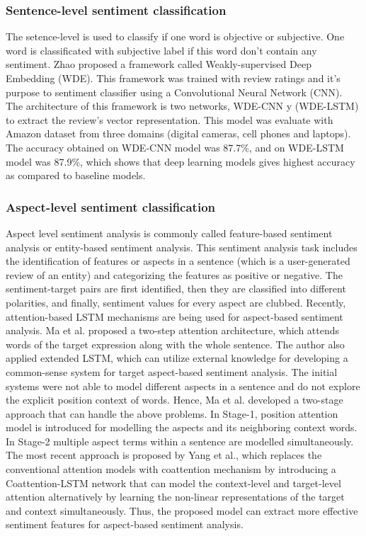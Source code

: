 \subsubsection{Sentence-level sentiment classification}

The setence-level is used to classify if one word is objective or subjective. One word is classificated with subjective label if this word don't contain any sentiment. Zhao\cite{Zhao_2018_weakly} proposed a framework called Weakly-supervised Deep Embedding (WDE). This framework was trained with review ratings and it's purpose to sentiment classifier using a Convolutional Neural Network (CNN). The architecture of this framework is two networks, WDE-CNN y (WDE-LSTM) to extract the review's vector representation. This model was evaluate with Amazon dataset from three domains (digital cameras, cell phones and laptops). The accuracy obtained on WDE-CNN model was 87.7\%, and on WDE-LSTM model was 87.9\%, which shows that deep learning models gives highest accuracy as compared to baseline models.

\subsubsection{Aspect-level sentiment classification}


Aspect level sentiment analysis is commonly called feature-based sentiment analysis or
entity-based sentiment analysis. This sentiment analysis task includes the identification of
features or aspects in a sentence (which is a user-generated review of an entity) and categorizing the features as positive or negative. The sentiment-target pairs are first identified, then they are classified into different polarities, and finally, sentiment values for every aspect are clubbed. Recently, attention-based LSTM mechanisms are being used for aspect-based sentiment analysis. Ma et al.\cite{Ma_2018} proposed a two-step attention architecture, which attends words of the target expression along with the whole sentence. The author also applied extended LSTM, which can utilize external knowledge for developing a common-sense system for target aspect-based sentiment analysis. The initial systems were not able to model different aspects in a sentence and do not explore the explicit position context of words. Hence, Ma et al.\cite{Ma_2019} developed a two-stage approach that can handle the above problems. In Stage-1, position attention model is introduced for modelling the aspects and its neighboring context words. In Stage-2 multiple aspect terms within a sentence are modelled simultaneously. The most recent approach is proposed by Yang et al.\cite{Yang_2019a}, which replaces the conventional attention models with coattention mechanism by introducing a Coattention-LSTM network that can model the context-level and target-level attention alternatively by learning the non-linear representations of the target and context simultaneously. Thus, the proposed model can extract more effective sentiment features for aspect-based sentiment analysis.

